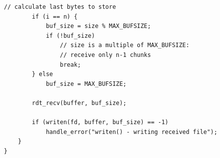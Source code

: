 \begin{lstlisting}[title=cmd\_commons.c]
		// calculate last bytes to store 
		if (i == n) {           
			buf_size = size % MAX_BUFSIZE;
			if (!buf_size)
				// size is a multiple of MAX_BUFSIZE:
				// receive only n-1 chunks
				break;          
		} else
			buf_size = MAX_BUFSIZE;
                                                                                              
		rdt_recv(buffer, buf_size);
                                                                                              
		if (writen(fd, buffer, buf_size) == -1)
			handle_error("writen() - writing received file");
	}
}
\end{lstlisting}




